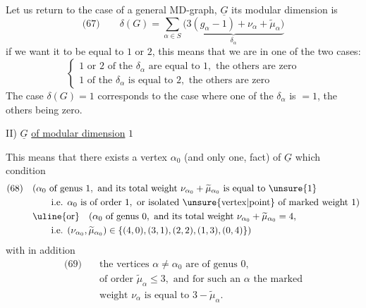 Let us return to the case of a general MD-graph, $\underline G$ its modular dimension is
\[
\text{(67)}\qquad\delta(G)=\sum_{\alpha\in S}\underbrace{\bigl(3(g_\alpha-1)+\nu_\alpha+\widetilde\mu_\alpha\bigr)}_{\delta_\alpha}
\]
if we want it to be equal to $1$ or $2$, this means that we are in one of the two cases:
\[
\left\{\begin{array}{l}
1\text{ or }2\text{ of the }\delta_\alpha\text{ are equal to }1,\text{ the others are zero}\\
1\text{ of the }\delta_\alpha\text{ is equal to }2,\text{ the others are zero}
\end{array}\right.
\]
The case $\delta(G)=1$ corresponds to the case where  one of the $\delta_\alpha$ is $=1$, the others being zero.

II) $\underline G$ \uline{of modular dimension} $1$

This means that there exists a vertex $\alpha_0$ (and only one,  fact) of $\underline G$ which   condition
\[
\begin{aligned}
\text{(68)}\quad &(\alpha_0\text{ of genus }1,\text{ and its total weight }\nu_{\alpha_0}+\widetilde\mu_{\alpha_0}\text{ is equal to }\unsure{1}\\
&\qquad\text{i.e. }\alpha_0\text{ is of order }1,\text{ or isolated \unsure{vertex|point} of marked weight }1)\\
&\uline{\text{or}}\quad(\alpha_0\text{ of genus }0,\text{ and its total weight }\nu_{\alpha_0}+\widetilde\mu_{\alpha_0}=4,\\
&\qquad\text{i.e. }(\nu_{\alpha_0},\widetilde\mu_{\alpha_0})\in\{(4,0),(3,1),(2,2),(1,3),(0,4)\})
\end{aligned}
\]
with in addition
\[
\begin{aligned}
\text{(69)}\quad&\text{the vertices }\alpha\ne\alpha_0\text{ are of genus }0,\\
&\text{of order }\widetilde\mu_\alpha\leq3,\text{ and for such an }\alpha\text{ the marked}\\
&\text{weight }\nu_\alpha\text{ is equal to }3-\widetilde\mu_\alpha.
\end{aligned}
\]
